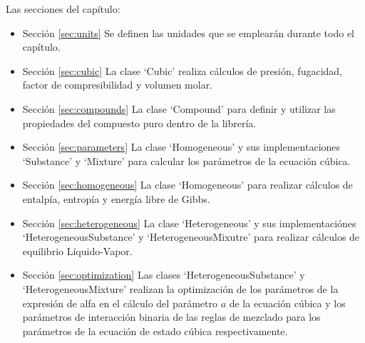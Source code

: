 	Las secciones del capítulo:
	\begin{itemize}
		\item{Sección} \ref{sec:units} Se definen las unidades que se emplearán durante todo el capítulo.
		\item{Sección} \ref{sec:cubic}  La clase `Cubic' realiza cálculos de presión, fugacidad, factor de compresibilidad y volumen molar.
		\item{Sección} \ref{sec:compounds} La clase `Compound' para definir y utilizar las propiedades del compuesto puro dentro de la librería.
		\item {Sección} \ref{sec:parameters} La clase `Homogeneous' y sus implementaciones `Substance' y `Mixture' para calcular los parámetros de la ecuación cúbica.
		\item {Sección} \ref{sec:homogeneous} La clase `Homogeneous' para realizar cálculos de entalpía, entropía y energía libre de Gibbs.
		\item {Sección} \ref{sec:heterogeneous} La clase `Heterogeneous' y sus implementaciónes `HeterogeneousSubstance' y `HeterogeneousMixutre' para realizar cálculos de equilibrio Líquido-Vapor.
		\item {Sección} \ref{sec:optimization} Las clases `HeterogeneousSubstance' y `HeterogeneousMixture' realizan la optimización de los parámetros de la expresión de alfa en el cálculo del parámetro $a$ de la ecuación cúbica y los parámetros de interacción binaria de las reglas de mezclado para los parámetros de la ecuación de estado cúbica respectivamente.
	\end{itemize}


				